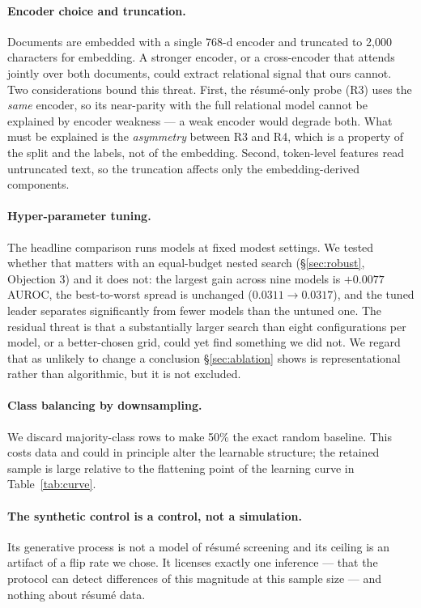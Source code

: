 \documentclass[11pt]{article}                      %
\begin{document}
\paragraph{Encoder choice and truncation.}
Documents are embedded with a single 768-d encoder and truncated to 2{,}000
characters for embedding. A stronger encoder, or a cross-encoder that attends
jointly over both documents, could extract relational signal that ours cannot.
Two considerations bound this threat. First, the résumé-only probe (R3) uses the
\emph{same} encoder, so its near-parity with the full relational model cannot be
explained by encoder weakness --- a weak encoder would degrade both. What must be
explained is the \emph{asymmetry} between R3 and R4, which is a property of the
split and the labels, not of the embedding. Second, token-level features read
untruncated text, so the truncation affects only the embedding-derived
components.

\paragraph{Hyper-parameter tuning.}
The headline comparison runs models at fixed modest settings. We tested whether
that matters with an equal-budget nested search (\S\ref{sec:robust}, Objection 3)
and it does not: the largest gain across nine models is $+0.0077$ AUROC, the
best-to-worst spread is unchanged ($0.0311 \rightarrow 0.0317$), and the tuned
leader separates significantly from fewer models than the untuned one. The
residual threat is that a substantially larger search than eight configurations
per model, or a better-chosen grid, could yet find something we did not. We
regard that as unlikely to change a conclusion \S\ref{sec:ablation} shows is
representational rather than algorithmic, but it is not excluded.

\paragraph{Class balancing by downsampling.}
We discard majority-class rows to make 50\% the exact random baseline. This costs
data and could in principle alter the learnable structure; the retained sample is
large relative to the flattening point of the learning curve in
Table~\ref{tab:curve}.

\paragraph{The synthetic control is a control, not a simulation.}
Its generative process is not a model of résumé screening and its ceiling is an
artifact of a flip rate we chose. It licenses exactly one inference --- that the
protocol can detect differences of this magnitude at this sample size --- and
nothing about résumé data.
\end{document}
